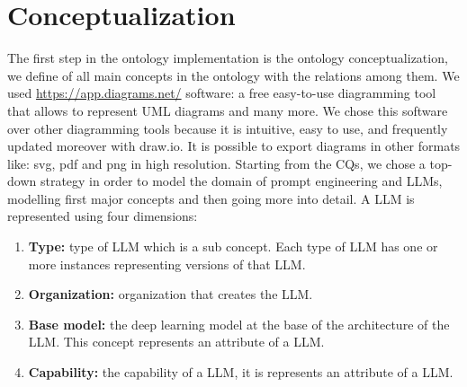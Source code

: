 \section{Conceptualization}
\label{section:4_1_conceptualization}
The first step in the ontology implementation is the ontology conceptualization, we define of all main concepts in the ontology with the relations among them.
We used \href{draw.io}{https://app.diagrams.net/} software: a free easy-to-use diagramming tool that allows to represent UML diagrams and many more.
We chose this software over other diagramming tools because it is intuitive, easy to use, and frequently updated moreover with draw.io. It is possible to export diagrams in other formats like: svg, pdf and png in high resolution.
Starting from the CQs, we chose a top-down strategy in order to model the domain of prompt engineering and LLMs, modelling first major concepts and then going more into detail.
A LLM is represented using four dimensions:
\begin{enumerate}
    \item \textbf{Type:} type of LLM which is a sub concept. Each type of LLM has one or more instances representing versions of that LLM.

    \item \textbf{Organization:} organization that creates the LLM.

    \item \textbf{Base model:} the deep learning model at the base of the architecture of the LLM. This concept represents an attribute of a LLM.

    \item \textbf{Capability:} the capability of a LLM, it is represents an attribute of a LLM.
\end{enumerate}
